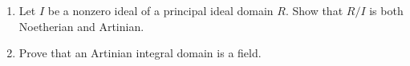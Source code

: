 \documentclass[12pt]{article}
\begin{document}
\begin{enumerate}
 \item  Let $I$ be a nonzero ideal of a principal ideal domain $R$.
         Show that $R/I$ is both Noetherian and Artinian.
   \vspace{-2pt}

\item  Prove that an Artinian integral domain is a field.
   \vspace{-2pt}



   
\end{enumerate}
\end{document}
